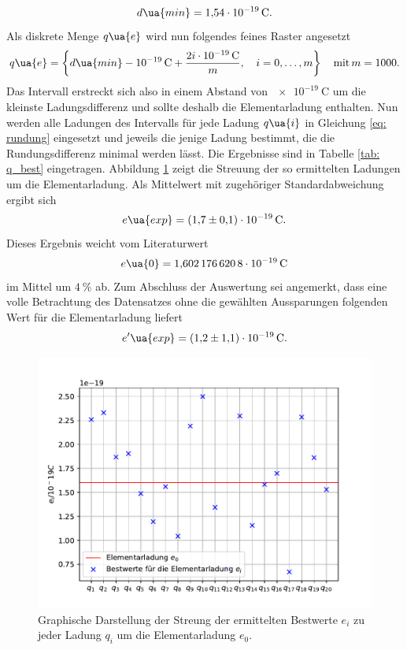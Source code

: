 \begin{equation}
  d\ua{min} = \SI{1.54e-19}{\coulomb}.
\end{equation}
Als diskrete Menge $q\ua{e}$ wird nun folgendes feines Raster angesetzt
\begin{equation}
  q\ua{e} = \left\{ d\ua{min} - \SI{e-19}{\coulomb}  +  \frac{2i \cdot \SI{e-19}{\coulomb}}{m}, \quad i = 0, \dots, m     \right\}\quad \text{mit} \, m = 1000.
\end{equation}
Das Intervall erstreckt sich also in einem Abstand von $\SI{e-19}{\coulomb}$ um die kleinste Ladungsdifferenz und sollte deshalb die Elementarladung enthalten.
Nun werden alle Ladungen des Intervalls für jede Ladung $q\ua{i}$ in Gleichung \eqref{eq: rundung} eingesetzt und jeweils die jenige Ladung bestimmt,
die die Rundungsdifferenz minimal werden lässt. Die Ergebnisse sind in Tabelle \ref{tab: q_best} eingetragen. Abbildung \ref{fig: streuung} zeigt die Streuung
der so ermittelten Ladungen um die Elementarladung. Als Mittelwert mit zugehöriger Standardabweichung ergibt sich
\begin{equation}
  e\ua{exp} = \SI{+1.7(1)e-19}{\coulomb}.
\end{equation}
Dieses Ergebnis weicht vom Literaturwert
\begin{equation}
  e\ua{0} = \SI{1.6021766208e-19}{\coulomb}
\end{equation}
im Mittel um $\SI{4}{\percent}$ ab. Zum Abschluss der Auswertung sei angemerkt, dass eine volle Betrachtung des Datensatzes ohne
die gewählten Aussparungen folgenden Wert für die Elementarladung liefert
\begin{equation}
   e'\ua{exp} = \SI{+1.2(11)e-19}{\coulomb}.
\end{equation}

\begin{figure}
  \centering
  \includegraphics{../Messdaten/scattering.pdf}
  \caption{Graphische Darstellung der Streung der ermittelten Bestwerte $e_i$ zu jeder Ladung $q_i$ um die Elementarladung $e_0$.}
  \label{fig: streuung}
\end{figure}
